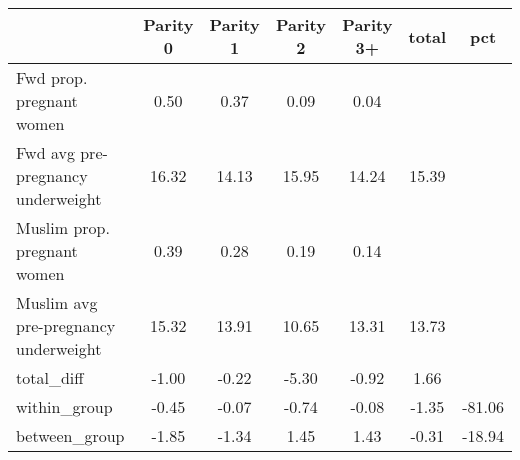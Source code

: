 \begin{tabular}{l*{6}{c}}
\toprule
            &\multicolumn{1}{c}{Parity 0}&\multicolumn{1}{c}{Parity 1}&\multicolumn{1}{c}{Parity 2}&\multicolumn{1}{c}{Parity 3+}&\multicolumn{1}{c}{total}&\multicolumn{1}{c}{pct}\\
\midrule
\midrule
Fwd prop. pregnant women&        0.50&        0.37&        0.09&        0.04&            &            \\
Fwd avg pre-pregnancy underweight&       16.32&       14.13&       15.95&       14.24&       15.39&            \\
Muslim prop. pregnant women&        0.39&        0.28&        0.19&        0.14&            &            \\
Muslim avg pre-pregnancy underweight&       15.32&       13.91&       10.65&       13.31&       13.73&            \\
total\_diff  &       -1.00&       -0.22&       -5.30&       -0.92&        1.66&            \\
within\_group&       -0.45&       -0.07&       -0.74&       -0.08&       -1.35&      -81.06\\
between\_group&       -1.85&       -1.34&        1.45&        1.43&       -0.31&      -18.94\\
\bottomrule
\end{tabular}
